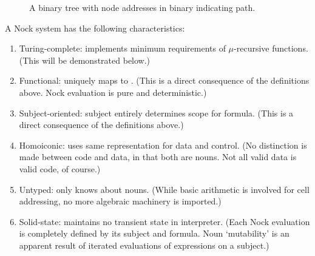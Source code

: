 \begin{figure}[hbt!]
  \centering
  \caption{A binary tree with node addresses in binary indicating path. \label{fig:tree-binary}}
\end{figure}


A Nock system has the following characteristics:

\begin{enumerate}
  \item  Turing-complete:  implements minimum requirements of $\mu$-recursive functions.  (This will be demonstrated below.)
  \item  Functional:  uniquely maps  to .  (This is a direct consequence of the definitions above.  Nock evaluation is pure and deterministic.)
  \item  Subject-oriented:  subject entirely determines scope for formula.  (This is a direct consequence of the definitions above.)
  \item  Homoiconic:  uses same representation for data and control.  (No distinction is made between code and data, in that both are nouns.  Not all valid data is valid code, of course.)
  \item  Untyped:  only knows about nouns.  (While basic arithmetic is involved for cell addressing, no more algebraic machinery is imported.)
  \item  Solid-state:  maintains no transient state in interpreter.  (Each Nock evaluation is completely defined by its subject and formula.  Noun `mutability' is an apparent result of iterated evaluations of expressions on a subject.)
\end{enumerate}


